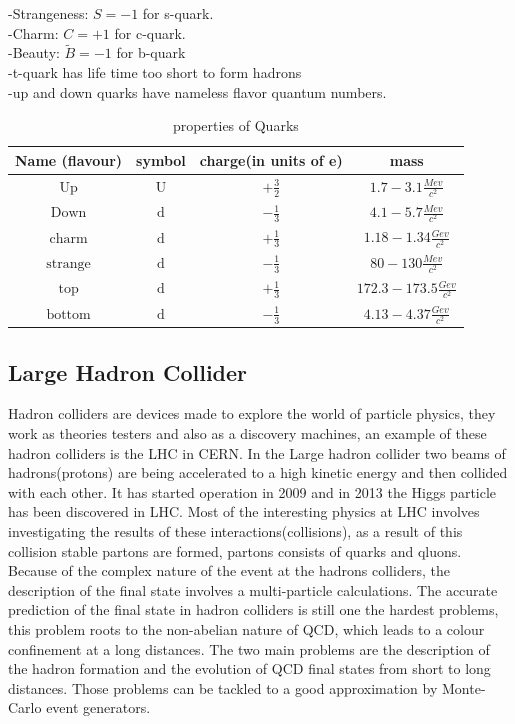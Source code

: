 \documentclass[12pt,a4paper]{article}
\begin{document}
\noindent -Strangeness: $S=-1$ for s-quark. \\
-Charm: $C=+1$ for c-quark. \\
-Beauty: $\tilde{B}=-1$ for b-quark \\
-t-quark has life time too short to form hadrons \\
-up and down quarks have nameless flavor quantum numbers.\\
\begin{table}
\begin{center} 
 \begin{tabular}{|c|c|c|c|} \hline 
  Name (flavour) & symbol & charge(in units of e) & mass  \\ \hline 
  $\text{Up}$ & $\text{U}$ &$ +\frac{3}{2}$ & $1.7-3.1 \frac{Mev}{c^2}$\\\hline
  $\text{Down}$&$\text{d}$&$-\frac{1}{3}$& $4.1-5.7\frac{Mev}{c^2}$\\\hline
  $\text{charm}$&$\text{d}$&$+\frac{1}{3}$&$1.18-1.34\frac{Gev}{c^2}$\\\hline
  $\text{strange}$&$\text{d}$&$-\frac{1}{3}$&$80-130\frac{Mev}{c^2}$\\\hline
  $\text{top}$&$\text{d}$&$+\frac{1}{3}$&$172.3-173.5\frac{Gev}{c^2}$\\\hline
  $\text{bottom}$&$\text{d}$&$-\frac{1}{3}$&$4.13-4.37\frac{Gev}{c^2}$\\\hline
 \end{tabular}
 \caption{properties of Quarks}
\end{center}
\end{table}

\subsection{Large Hadron Collider}

Hadron colliders are devices made to explore the world of particle physics, they work as theories testers and also as a discovery machines, an example of these hadron colliders is the LHC in CERN. In the Large hadron collider two beams of hadrons(protons) are being accelerated to a high kinetic energy and then collided with each other. It has started operation in 2009 and in 2013 the Higgs particle has been discovered in LHC. Most of the interesting physics at LHC involves investigating the results of these interactions(collisions), as a result of this collision stable partons are formed, partons consists of quarks and qluons. Because of the complex nature of the event at the hadrons colliders, the description of the final state involves a multi-particle calculations. The accurate prediction of the final state in hadron colliders is still one the hardest problems, this problem roots to the non-abelian nature of QCD, which leads to a colour confinement at a long distances. The two main problems are the description of the hadron formation and the evolution of QCD final states from short to long distances. Those problems can be tackled to a good approximation by Monte-Carlo event generators. 
\end{document}
